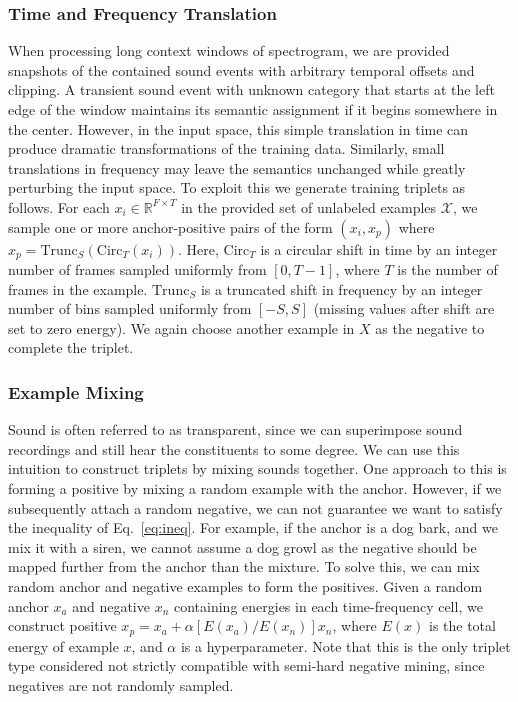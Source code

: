 \documentclass{article}
\begin{document}
\subsubsection{Time and Frequency Translation}
When processing long context windows of spectrogram, we are provided snapshots
of the contained sound events with arbitrary temporal offsets and clipping.  A
transient sound event with unknown category that starts at the left edge of the
window maintains its semantic assignment if it begins somewhere in the center.
However, in the input space, this simple translation in time can produce
dramatic transformations of the training data.  Similarly, small translations in
frequency may leave the semantics unchanged while greatly perturbing the input
space.  To exploit this we generate training triplets as follows. For each
$x_i\in\mathbb{R}^{F\times T}$ in the provided set of unlabeled examples
$\mathcal{X}$, we sample one or more anchor-positive pairs of the form
$(x_i,x_p)$ where $x_p = \mathrm{Trunc}_S(\mathrm{Circ}_T(x_i))$.  Here,
$\mathrm{Circ}_T$ is a circular shift in time by an integer number of frames
sampled uniformly from $[0,T-1]$, where $T$ is the number of frames in the
example. $\mathrm{Trunc}_S$ is a truncated shift in frequency by an integer
number of bins sampled uniformly from $[-S, S]$ (missing values after shift are
set to zero energy).  We again choose another example in $X$ as the negative to
complete the triplet.

\subsubsection{Example Mixing}
Sound is often referred to as transparent, since we can superimpose sound
recordings and still hear the constituents to some degree.  We can use this
intuition to construct triplets by mixing sounds together.  One approach to this
is forming a positive by mixing a random example with the anchor.  However, if
we subsequently attach a random negative, we can not guarantee we want to
satisfy the inequality of Eq.~\ref{eq:ineq}. For example, if the anchor is a dog
bark, and we mix it with a siren, we cannot assume a dog growl as the negative
should be mapped further from the anchor than the mixture.  To solve this, we
can mix random anchor and negative examples to form the positives. Given a
random anchor $x_a$ and negative $x_n$ containing energies in each
time-frequency cell, we construct positive $x_p = x_a + \alpha [E(x_a)/E(x_n)]
x_n$, where $E(x)$ is the total energy of example $x$, and $\alpha$ is a
hyperparameter.  Note that this is the only triplet type considered not strictly
compatible with semi-hard negative mining, since negatives are not randomly
sampled.
\end{document}
